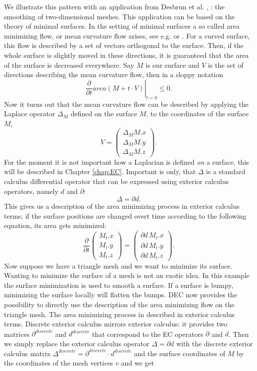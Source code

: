 We illustrate this pattern with an application from Desbrun et al. \cite{Desbrun:1999:IFI:311535.311576}, \cite{laplacebeltrami}: the smoothing of two-dimensional meshes. This application can be based on the theory of minimal surfaces. In the setting of minimal surfaces a so called area minimizing flow, or mean curvature flow arises, see e.g. \cite{carmo1992differentialgeometrie} or \cite{2011arXiv1102.1411C}. For a curved surface, this flow is described by a set of vectors orthogonal to the surface. Then, if the whole surface is slightly moved in these directions, it is guaranteed that the area of the surface is decreased everywhere. Say $M$ is our surface and $V$ is the set of directions describing the mean curvature flow, then in a sloppy notation
\[\left. \frac{\partial}{\partial t} area(M + t\cdot V) \right|_{t=0}\leq 0.\]
Now it turns out that the mean curvature flow can be described by applying the Laplace operator $\Delta_M$ defined on the surface $M$, to the coordinates of the surface $M$, 
\[V = \begin{pmatrix}
\Delta_M M.x \\
\Delta_M M.y \\
\Delta_M M.z
\end{pmatrix}.\]
For the moment it is not important how a Laplacian is defined \emph{on} a surface, this will be described in Chapter \ref{chap:EC}. Important is only, that $\Delta$ is a standard calculus differential operator that can be expressed using exterior calculus operators, namely $d$ and $\partial$: 
\[\Delta = \partial d.\]
This gives us a description of the area minimizing process in exterior calculus terms; if the surface positions are changed overt time according to the following equation, its area gets minimized:
\[\frac{\partial}{\partial t} \begin{pmatrix}
M_t.x \\
M_t.y \\
 M_t.z
\end{pmatrix} = \begin{pmatrix}
\partial d \,M_t.x \\
\partial d\, M_t.y \\
\partial d\, M_t.z
\end{pmatrix}.\]
Now suppose we have a triangle mesh and we want to minimize its surface. Wanting to minimize the surface of a mesh is not an exotic idea. In this example the surface minimization is used to smooth a surface. If a surface is bumpy, minimizing the surface locally will flatten the bumps. DEC now provides the possibility to directly use the description of the area minimizing flow on the triangle mesh. The area minimizing process in described in exterior calculus terms. Discrete exterior calculus mirrors exterior calculus: it provides two matrices $\partial^{discrete}$ and $d^{discrete}$ that correspond to the EC operators $\partial$ and $d$. Then we simply replace the exterior calculus operator $\Delta = \partial d$ with the  discrete exterior calculus matrix $\Delta^{discrete} = \partial^{discrete} \cdot d^{discrete}$ and the surface coordinates of $M$ by the coordinates of the mesh vertices $v$ and we get

